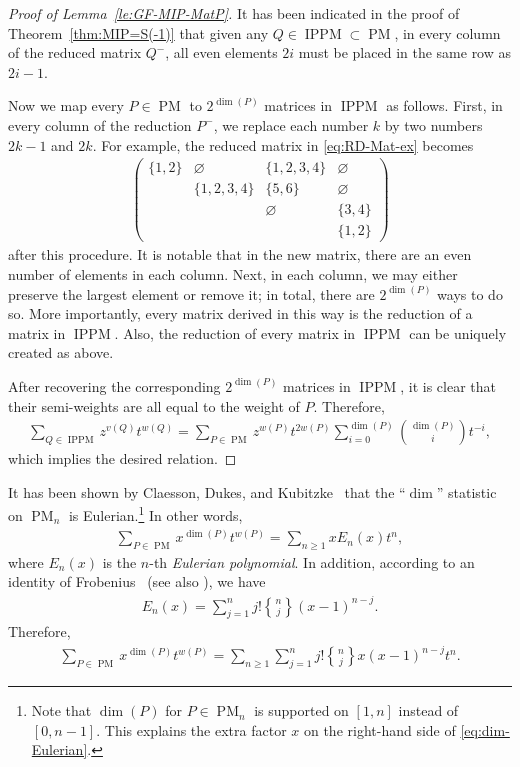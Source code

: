 \documentclass[12pt,reqno]{amsart}
\numberwithin{equation}{section}
\theoremstyle{theorem}
\theoremstyle{definition}
\theoremstyle{named}
\newcommand{\MatP}{\operatorname{PM}}
\newcommand{\stirlingb}[2]{{#1\brace #2}}
\newcommand{\sw}{v}
\newcommand{\IPPM}{\operatorname{IPPM}}
\begin{document}
\begin{proof}[Proof of Lemma~\ref{le:GF-MIP-MatP}]
	It has been indicated in the proof of Theorem~\ref{thm:MIP=S(-1)} that given any $Q\in \IPPM \subset \MatP$, in every column of the reduced matrix $Q^-$, all even elements $2i$ must be placed in the same row as $2i-1$.
	
	Now we map every $P\in \MatP$ to $2^{\dim(P)}$ matrices in $\IPPM$ as follows. First, in every column of the reduction $P^-$, we replace each number $k$ by two numbers $2k-1$ and $2k$. For example, the reduced matrix in \eqref{eq:RD-Mat-ex} becomes
	\begin{align*}
		\begin{pmatrix}
			\{1,2\} & \varnothing & \{1,2,3,4\} & \varnothing\\
			& \{1,2,3,4\} & \{5,6\} & \varnothing\\
			& & \varnothing & \{3,4\}\\
			& & & \{1,2\}
		\end{pmatrix}
	\end{align*}
	after this procedure. It is notable that in the new matrix, there are an even number of elements in each column. Next, in each column, we may either preserve the largest element or remove it; in total, there are $2^{\dim(P)}$ ways to do so. More importantly, every matrix derived in this way is the reduction of a matrix in $\IPPM$. Also, the reduction of every matrix in $\IPPM$ can be uniquely created as above.
	
	After recovering the corresponding $2^{\dim(P)}$ matrices in $\IPPM$, it is clear that their semi-weights are all equal to the weight of $P$. Therefore,
	\begin{align*}
		\sum_{Q\in \IPPM} z^{\sw(Q)} t^{w(Q)} = \sum_{P\in \MatP} z^{w(P)} t^{2w(P)} \sum_{i=0}^{\dim(P)} \binom{\dim(P)}{i} t^{-i},
	\end{align*}
	which implies the desired relation.
\end{proof}

It has been shown by Claesson, Dukes, and Kubitzke~\cite[p.~1627, Corollary~5]{CDK2011} that the ``$\dim$'' statistic on $\MatP_{n}$ is Eulerian.\footnote{Note that $\dim(P)$ for $P\in \MatP_{n}$ is supported on $[1,n]$ instead of $[0,n-1]$. This explains the extra factor $x$ on the right-hand side of \eqref{eq:dim-Eulerian}.} In other words,
\begin{align}\label{eq:dim-Eulerian}
	\sum_{P\in \MatP} x^{\dim(P)} t^{w(P)} = \sum_{n\ge 1} x E_n(x) t^n,
\end{align}
where $E_n(x)$ is the $n$-th \emph{Eulerian polynomial}. In addition, according to an identity of Frobenius~\cite{Fro1910} (see also \cite[p.~1, eq.~(3)]{FS1970}), we have
\begin{align}\label{eq:Frob}
	E_n(x) = \sum_{j=1}^n j! \stirlingb{n}{j} (x-1)^{n-j}.
\end{align}
Therefore,
\begin{align}\label{eq:MatP-gf-dim}
	\sum_{P\in \MatP} x^{\dim(P)} t^{w(P)} = \sum_{n\ge 1} \sum_{j=1}^n j! \stirlingb{n}{j} x (x-1)^{n-j} t^n.
\end{align}
\end{document}

